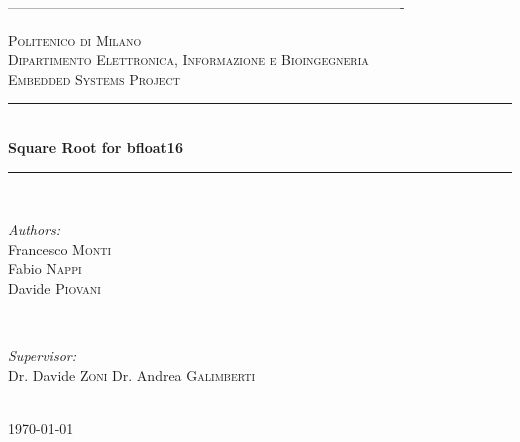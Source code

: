 \documentclass[12pt]{article}
\begin{document}
\begin{titlepage}

\newcommand{\HRule}{\rule{\linewidth}{0.5mm}} 

\center
-------------------------------------------------------------------------------------

\textsc{\LARGE Politenico di Milano}\\[1cm]
\textsc{\Large Dipartimento Elettronica, Informazione e Bioingegneria}\\[0.5cm] 
\textsc{\large Embedded Systems Project}\\[0.5cm] 


\HRule \\[0.4cm]
{ \huge \bfseries Square Root for bfloat16}\\[0.4cm]
\HRule \\[1.5cm]
 

\begin{minipage}{0.4\textwidth}
	\begin{flushleft} \large
		\emph{Authors:}\\
		Francesco \textsc{Monti} \\
		Fabio \textsc{Nappi} \\
		Davide \textsc{Piovani} 
	\end{flushleft}
\end{minipage}
~
\begin{minipage}{0.4\textwidth}
	\begin{flushright} \large
		\emph{Supervisor:} \\
		Dr. Davide \textsc{Zoni}
		Dr. Andrea \textsc{Galimberti}
	\end{flushright}
\end{minipage}\\[1.5cm]



{\large \today}\\[2cm] 


\end{titlepage}
\end{document}
